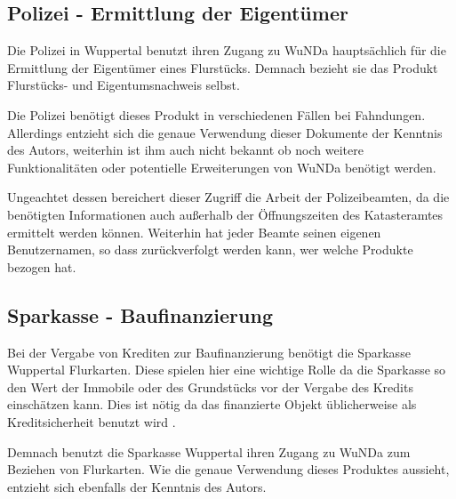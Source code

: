 \subsection{Polizei -  Ermittlung der Eigentümer} \label{subsec:polizei_ermittlung}
Die Polizei in Wuppertal benutzt ihren Zugang zu \ac{WuNDa} hauptsächlich für die Ermittlung der Eigentümer eines Flurstücks. Demnach bezieht sie das Produkt Flurstücks- und Eigentumsnachweis selbst.

Die Polizei benötigt dieses Produkt in verschiedenen Fällen bei Fahndungen. Allerdings entzieht sich die genaue Verwendung dieser Dokumente der Kenntnis des Autors, weiterhin ist ihm auch nicht bekannt ob noch weitere Funktionalitäten oder potentielle Erweiterungen von \ac{WuNDa} benötigt werden. 

Ungeachtet dessen bereichert dieser Zugriff die Arbeit der Polizeibeamten, da die benötigten Informationen auch außerhalb der Öffnungszeiten des Katasteramtes ermittelt werden können. Weiterhin hat jeder Beamte seinen eigenen Benutzernamen, so dass zurückverfolgt werden kann, wer welche Produkte bezogen hat.  

\subsection{Sparkasse - Baufinanzierung}
Bei der Vergabe von Krediten zur Baufinanzierung benötigt die Sparkasse Wuppertal Flurkarten. Diese spielen hier eine wichtige Rolle da die Sparkasse so den Wert der Immobile oder des Grundstücks vor der Vergabe des Kredits einschätzen kann. Dies ist nötig  da das finanzierte Objekt üblicherweise als Kreditsicherheit benutzt wird \autocite[vgl.][]{check24-flurkarte}. 

Demnach benutzt die Sparkasse Wuppertal ihren Zugang zu \ac{WuNDa} zum Beziehen von Flurkarten. Wie die genaue Verwendung dieses Produktes aussieht, entzieht sich ebenfalls der Kenntnis des Autors. 


